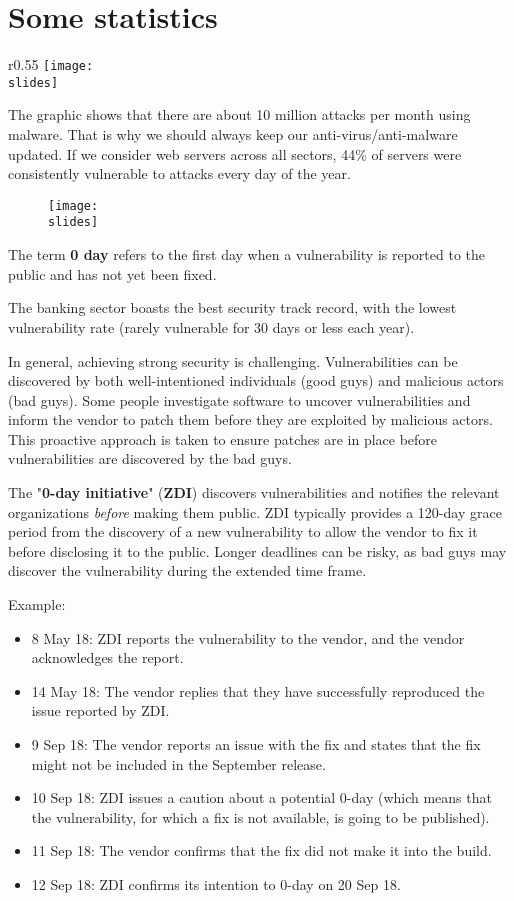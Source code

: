 \section{Some statistics}
\begin{wrapfigure}{r}{0.55\textwidth}
  \centering
  \texttt{[image: \\slides]}
\end{wrapfigure}
The graphic shows that there are about 10 million attacks per month using malware. That is why we should always keep our anti-virus/anti-malware updated.
If we consider web servers across all sectors, 44\% of servers were consistently vulnerable to attacks every day of the year.
\begin{figure}[h]
  \centering
  \texttt{[image: \\slides]}
\end{figure}

The term \textbf{0 day} refers to the first day when a vulnerability is reported to the public and has not yet been fixed.

The banking sector boasts the best security track record, with the lowest vulnerability rate (rarely vulnerable for 30 days or less each year).

In general, achieving strong security is challenging. Vulnerabilities can be discovered by both well-intentioned individuals (good guys) and malicious actors (bad guys). Some people investigate software to uncover vulnerabilities and inform the vendor to patch them before they are exploited by malicious actors. This proactive approach is taken to ensure patches are in place before vulnerabilities are discovered by the bad guys.

The "\textbf{0-day initiative}" (\textbf{ZDI}) discovers vulnerabilities and notifies the relevant organizations \emph{before} making them public. ZDI typically provides a 120-day grace period from the discovery of a new vulnerability to allow the vendor to fix it before disclosing it to the public. Longer deadlines can be risky, as bad guys may discover the vulnerability during the extended time frame.

\vspace{5mm}
Example:
\begin{itemize}
  \item 8 May 18: ZDI reports the vulnerability to the vendor, and the vendor acknowledges the report.
  \item 14 May 18: The vendor replies that they have successfully reproduced the issue reported by ZDI.
  \item 9 Sep 18: The vendor reports an issue with the fix and states that the fix might not be included in the September release.
  \item 10 Sep 18: ZDI issues a caution about a potential 0-day (which means that the vulnerability, for which a fix is not available, is going to be published).
  \item 11 Sep 18: The vendor confirms that the fix did not make it into the build.
  \item 12 Sep 18: ZDI confirms its intention to 0-day on 20 Sep 18.
\end{itemize}


